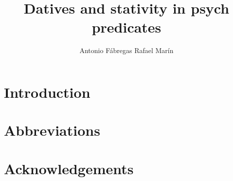 \documentclass[output=paper]{langsci/langscibook}
\author{Antonio Fábregas\affiliation{}\lastand 
Rafael Marín\affiliation{}}
\title{Datives and stativity in psych predicates}
\begin{document}
\section{Introduction}  
 
\section*{Abbreviations}
\section*{Acknowledgements}

\sloppy
\printbibliography[heading=subbibliography,notkeyword=this] 
\end{document}
